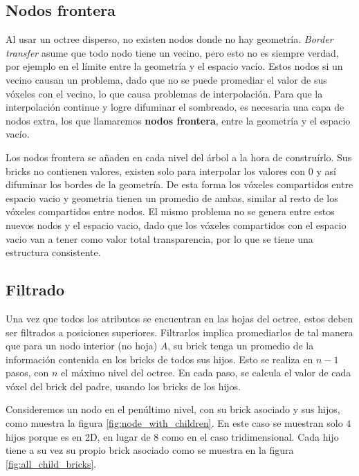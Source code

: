 
\subsection{Nodos frontera}

Al usar un octree disperso, no existen nodos donde no hay geometría.
\textit{Border transfer} asume que todo nodo tiene un vecino, pero esto no es siempre verdad, por ejemplo en el límite entre la geometría y el espacio vacío.
Estos nodos si un vecino causan un problema, dado que no se puede promediar el valor de sus vóxeles con el vecino, lo que causa problemas de interpolación.
Para que la interpolación continue y logre difuminar el sombreado, es necesaria una capa de nodos extra, los que llamaremos \textbf{nodos frontera}, entre la geometría y el espacio vacío.

Los nodos frontera se añaden en cada nivel del árbol a la hora de construírlo.
Sus bricks no contienen valores, existen solo para interpolar los valores con 0 y así difuminar los bordes de la geometría.
De esta forma los vóxeles compartidos entre espacio vacio y geometria tienen un promedio de ambas, similar al resto de los vóxeles compartidos entre nodos.
El mismo problema no se genera entre estos nuevos nodos y el espacio vacio, dado que los vóxeles compartidos con el espacio vacio van a tener como valor total transparencia, por lo que se tiene una estructura consistente.


\subsection{Filtrado}\label{design:filtering}

Una vez que todos los atributos se encuentran en las hojas del octree, estos deben ser filtrados a posiciones superiores.
Filtrarlos implica promediarlos de tal manera que para un nodo interior (no hoja) $A$, su brick tenga un promedio de la información contenida en los bricks de todos sus hijos.
Esto se realiza en $n - 1$ pasos, con $n$ el máximo nivel del octree.
En cada paso, se calcula el valor de cada vóxel del brick del padre, usando los bricks de los hijos.

Consideremos un nodo en el penúltimo nivel, con su brick asociado y sus hijos, como muestra la figura \ref{fig:node_with_children}.
En este caso se muestran solo $4$ hijos porque es en 2D, en lugar de $8$ como en el caso tridimensional.
Cada hijo tiene a su vez su propio brick asociado como se muestra en la figura \ref{fig:all_child_bricks}.


